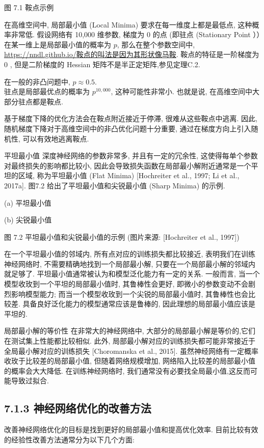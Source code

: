 \documentclass[10pt]{article}
\begin{document}
图 7.1 鞍点示例

在高维空间中, 局部最小值 (Local Minima) 要求在每一维度上都是最低点, 这种概率非常低. 假设网络有 10,000 维参数, 梯度为 0 的点 (即驻点 (Stationary Point ））在某一维上是局部最小值的概率为 $p$, 那么在整个参数空间中, \href{https://nndl.github.io/%E9%9E%8D%E7%82%B9%E7%9A%84%E5%8F%AB%E6%B3%95%E6%98%AF%E5%9B%A0%E4%B8%BA%E5%85%B6%E5%BD%A2%E7%8A%B6%E5%83%8F%E9%A9%AC%E9%9E%8D}{https://nndl.github.io/鞍点的叫法是因为其形状像马鞍}. 鞍点的特征是一阶梯度为 0 , 但是二阶梯度的 Hessian 矩阵不是半正定矩阵,参见定理C.2.

在一般的非凸问题中, $p \approx 0.5$.\\
驻点是局部最优点的概率为 $p^{10,000}$, 这种可能性非常小. 也就是说, 在高维空间中大部分驻点都是鞍点.

基于梯度下降的优化方法会在鞍点附近接近于停滞, 很难从这些鞍点中逃离. 因此, 随机梯度下降对于高维空间中的非凸优化问题十分重要, 通过在梯度方向上引入随机性, 可以有效地逃离鞍点.

平坦最小值 深度神经网络的参数非常多, 并且有一定的冗余性, 这使得每单个参数对最终损失的影响都比较小, 因此会导致损失函数在局部最小解附近通常是一个平坦的区域, 称为平坦最小值 (Flat Minima) [Hochreiter et al., 1997; Li et al., 2017a]. 图7.2 给出了平坦最小值和尖锐最小值 (Sharp Minima) 的示例.



(a) 平坦最小值



(b) 尖锐最小值

图 7.2 平坦最小值和尖锐最小值的示例 (图片来源: [Hochreiter et al., 1997])

在一个平坦最小值的邻域内, 所有点对应的训练损失都比较接近, 表明我们在训练神经网络时, 不需要精确地找到一个局部最小解, 只要在一个局部最小解的邻域内就足够了. 平坦最小值通常被认为和模型泛化能力有一定的关系. 一般而言, 当一个模型收玫到一个平坦的局部最小值时, 其鲁棒性会更好, 即微小的参数变动不会剧烈影响模型能力; 而当一个模型收玫到一个尖锐的局部最小值时, 其鲁棒性也会比较差. 具备良好泛化能力的模型通常应该是鲁棒的, 因此理想的局部最小值应该是平坦的.

局部最小解的等价性 在非常大的神经网络中, 大部分的局部最小解是等价的,它们在测试集上性能都比较相似. 此外, 局部最小解对应的训练损失都可能非常接近于全局最小解对应的训练损失 [Choromanska et al., 2015]. 虽然神经网络有一定概率收玫于比较差的局部最小值, 但随着网络规模增加, 网络陷入比较差的局部最小值的概率会大大降低. 在训练神经网络时, 我们通常没有必要找全局最小值,这反而可能导致过拟合.

\subsection*{7.1.3 神经网络优化的改善方法}
改善神经网络优化的目标是找到更好的局部最小值和提高优化效率. 目前比较有效的经验性改善方法通常分为以下几个方面:
\end{document}
